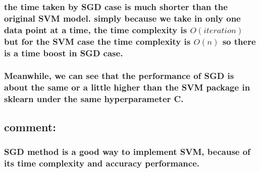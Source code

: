 \documentclass[11pt]{article}
\begin{document}
\hypertarget{the-time-taken-by-sgd-case-is-much-shorter-than-the-original-svm-model.-simply-because-we-take-in-only-one-data-point-at-a-time-the-time-complexity-is-oiteration-but-for-the-svm-case-the-time-complexity-is-on-so-there-is-a-time-boost-in-sgd-case.}{%
\subsubsection{\texorpdfstring{the time taken by SGD case is much
shorter than the original SVM model. simply because we take in only one
data point at a time, the time complexity is \(O(iteration)\) but for
the SVM case the time complexity is \(O(n)\) so there is a time boost in
SGD
case.}{the time taken by SGD case is much shorter than the original SVM model. simply because we take in only one data point at a time, the time complexity is O(iteration) but for the SVM case the time complexity is O(n) so there is a time boost in SGD case.}}\label{the-time-taken-by-sgd-case-is-much-shorter-than-the-original-svm-model.-simply-because-we-take-in-only-one-data-point-at-a-time-the-time-complexity-is-oiteration-but-for-the-svm-case-the-time-complexity-is-on-so-there-is-a-time-boost-in-sgd-case.}}

\hypertarget{meanwhile-we-can-see-that-the-performance-of-sgd-is-about-the-same-or-a-little-higher-than-the-svm-package-in-sklearn-under-the-same-hyperparameter-c.}{%
\subsubsection{Meanwhile, we can see that the performance of SGD is
about the same or a little higher than the SVM package in sklearn under
the same hyperparameter
C.}\label{meanwhile-we-can-see-that-the-performance-of-sgd-is-about-the-same-or-a-little-higher-than-the-svm-package-in-sklearn-under-the-same-hyperparameter-c.}}

\hypertarget{comment}{%
\subsection{comment:}\label{comment}}

\hypertarget{sgd-method-is-a-good-way-to-implement-svm-because-of-its-time-complexity-and-accuracy-performance.}{%
\subsubsection{SGD method is a good way to implement SVM, because of its
time complexity and accuracy
performance.}\label{sgd-method-is-a-good-way-to-implement-svm-because-of-its-time-complexity-and-accuracy-performance.}}
\end{document}
